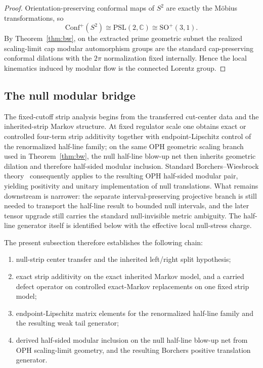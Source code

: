\documentclass[11pt]{article}
\newcommand{\Conf}{\mathrm{Conf}}
\begin{document}
\begin{proof}
Orientation-preserving conformal maps of \(S^2\) are exactly the M\"obius transformations, so
\[
\Conf^+(S^2)\cong \mathrm{PSL}(2,\mathbb C)\cong \mathrm{SO}^+(3,1).
\]
By Theorem~\ref{thm:bw}, on the extracted prime geometric subnet the realized scaling-limit cap modular automorphism groups are the standard cap-preserving conformal dilations with the \(2\pi\) normalization fixed internally. Hence the local kinematics induced by modular flow is the connected Lorentz group.
\end{proof}
\subsection{The null modular bridge}

The fixed-cutoff strip analysis begins from the transferred cut-center data and the inherited-strip Markov structure. At fixed regulator scale one obtains exact or controlled four-term strip additivity together with endpoint-Lipschitz control of the renormalized half-line family; on the same OPH geometric scaling branch used in Theorem~\ref{thm:bw}, the null half-line blow-up net then inherits geometric dilation and therefore half-sided modular inclusion. Standard Borchers--Wiesbrock theory~\cite{wiesbrock93} consequently applies to the resulting OPH half-sided modular pair, yielding positivity and unitary implementation of null translations. What remains downstream is narrower: the separate interval-preserving projective branch is still needed to transport the half-line result to bounded null intervals, and the later tensor upgrade still carries the standard null-invisible metric ambiguity. The half-line generator itself is identified below with the effective local null-stress charge.
\par
The present subsection therefore establishes the following chain:
\begin{enumerate}[leftmargin=2em]
\item null-strip center transfer and the inherited left/right split hypothesis;
\item exact strip additivity on the exact inherited Markov model, and a carried defect operator on controlled exact-Markov replacements on one fixed strip model;
\item endpoint-Lipschitz matrix elements for the renormalized half-line family and the resulting weak tail generator;
\item derived half-sided modular inclusion on the null half-line blow-up net from OPH scaling-limit geometry, and the resulting Borchers positive translation generator.
\end{enumerate}
\end{document}
